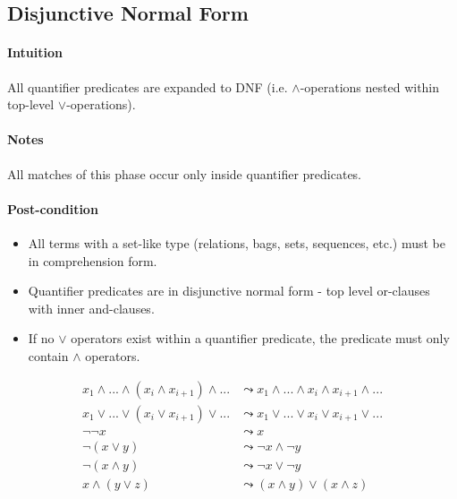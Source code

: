 \subsection{Disjunctive Normal Form}

\paragraph{Intuition} All quantifier predicates are expanded to DNF (i.e. $\land$-operations nested within top-level $\lor$-operations).

\paragraph{Notes} All matches of this phase occur only inside quantifier predicates.

\paragraph{Post-condition}
\begin{itemize}
  \item All terms with a set-like type (relations, bags, sets, sequences, etc.) must be in comprehension form.
  \item Quantifier predicates are in disjunctive normal form - top level or-clauses with inner and-clauses.
  \item If no $\lor$ operators exist within a quantifier predicate, the predicate must only contain $\land$ operators.
\end{itemize}

\noindent\begin{minipage}{\linewidth} %
\begin{align}
  \tag{Flatten Nested $\land$}
  x_1 \land ... \land (x_i \land x_{i+1}) \land ...
  &\leadsto
  x_1 \land ... \land x_i \land x_{i+1} \land ...
  \\
  \tag{Flatten Nested $\lor$}
  x_1 \lor ... \lor (x_i \lor x_{i+1}) \lor ...
  &\leadsto
  x_1 \lor ... \lor x_i \lor x_{i+1} \lor ...
  \\
  \tag{Double Negation}
  \lnot \lnot x
  &\leadsto
  x
  \\
  \tag{Distribute De Morgan - Or}
  \lnot (x \lor y)
  &\leadsto
  \lnot x \land \lnot y
  \\
  \tag{Distribute De Morgan - And}
  \lnot (x \land y)
  &\leadsto
  \lnot x \lor \lnot y
  \\
  \tag{Distribute $\land$ over $\lor$}
  x \land (y \lor z)
  &\leadsto
  (x \land y) \lor (x \land z)
\end{align}
\end{minipage}

